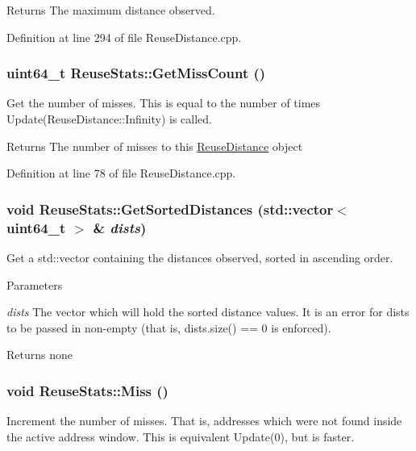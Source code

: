 \begin{DoxyReturn}{Returns}
The maximum distance observed. 
\end{DoxyReturn}


Definition at line 294 of file ReuseDistance.cpp.

\hypertarget{class_reuse_stats_aeff4f3fe0f2253e1aed432b18ec85d85}{
\subsubsection[{GetMissCount}]{\setlength{\rightskip}{0pt plus 5cm}uint64\_\-t ReuseStats::GetMissCount ()}}
\label{class_reuse_stats_aeff4f3fe0f2253e1aed432b18ec85d85}
Get the number of misses. This is equal to the number of times Update(ReuseDistance::Infinity) is called.

\begin{DoxyReturn}{Returns}
The number of misses to this \hyperlink{class_reuse_distance}{ReuseDistance} object 
\end{DoxyReturn}


Definition at line 78 of file ReuseDistance.cpp.

\hypertarget{class_reuse_stats_adcb657e303c090ac5ef210f6c4506986}{
\subsubsection[{GetSortedDistances}]{\setlength{\rightskip}{0pt plus 5cm}void ReuseStats::GetSortedDistances (std::vector$<$ uint64\_\-t $>$ \& {\em dists})}}
\label{class_reuse_stats_adcb657e303c090ac5ef210f6c4506986}
Get a std::vector containing the distances observed, sorted in ascending order.


\begin{DoxyParams}{Parameters}
\item[{\em dists}]The vector which will hold the sorted distance values. It is an error for dists to be passed in non-\/empty (that is, dists.size() == 0 is enforced).\end{DoxyParams}
\begin{DoxyReturn}{Returns}
none 
\end{DoxyReturn}
\hypertarget{class_reuse_stats_a3d963a3b6c2c0b37b23d4e0723a70831}{
\subsubsection[{Miss}]{\setlength{\rightskip}{0pt plus 5cm}void ReuseStats::Miss ()}}
\label{class_reuse_stats_a3d963a3b6c2c0b37b23d4e0723a70831}
Increment the number of misses. That is, addresses which were not found inside the active address window. This is equivalent Update(0), but is faster.

